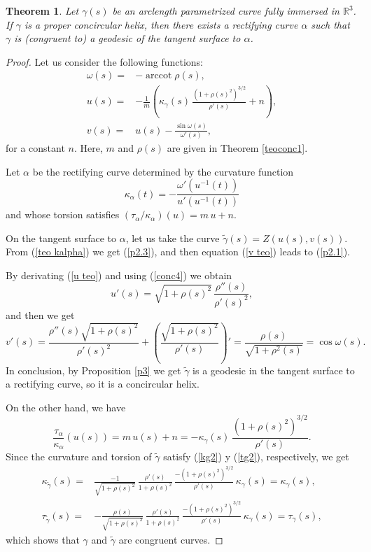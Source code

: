 \documentclass[10pt,a4paper]{amsart}
\newtheorem{theorem}{Theorem}
\def\R#1{\ensuremath{\mathbb{R}^{#1}}}
\def\Y{Z}
\DeclareMathOperator{\arccot}{arccot}
\def\tgamma{\widetilde{\gamma}}
\begin{document}
\begin{theorem}\label{th1}
Let $\gamma(s)$ be an arclength parametrized curve fully immersed in $\R3$. If $\gamma$ is a proper concircular helix, then there exists a rectifying curve $\alpha$ such that $\gamma$ is (congruent to) a geodesic of the tangent surface to $\alpha$.
\end{theorem}

\begin{proof}
Let us consider the following functions:
\begin{align}
\omega(s)= & -\arccot\rho(s), \label{w teo}\\
u(s)= & -\frac{1}{m}\left(\kappa_\gamma(s)\,\frac{(1+\rho(s)^2)^{3/2}}{\rho'(s)}+n\right), \label{u teo}\\
v(s)= & u(s)-\frac{\sin\omega(s)}{\omega'(s)}, \label{v teo}
\end{align}
for a constant $n$. Here, $m$ and $\rho(s)$ are given in Theorem \ref{teoconc1}.

Let $\alpha$ be the rectifying curve determined by the curvature function
\begin{equation}\label{teo kalpha}
  \kappa_\alpha(t)=-\frac{\omega'(u^{-1}(t))}{u'(u^{-1}(t))}
\end{equation}
and whose torsion satisfies $(\tau_\alpha/\kappa_\alpha)(u)=m\,u+n$.

On the tangent surface to $\alpha$, let us take the curve $\tgamma(s)=\Y(u(s),v(s))$. From (\ref{teo kalpha}) we get (\ref{p2.3}), and then equation (\ref{v teo}) leads to (\ref{p2.1}).

By derivating (\ref{u teo}) and using (\ref{conc4}) we obtain
\[
u'(s)=\sqrt{1+\rho(s)^2}\,\frac{\rho''(s)}{\rho'(s)^2},
\]
and then we get
\[
v'(s)=\frac{\rho''(s)\sqrt{1+\rho(s)^2}}{\rho'(s)^2}+ \left(\frac{\sqrt{1+\rho(s)^2}}{\rho'(s)}\right)'
   =\frac{\rho(s)}{\sqrt{1+\rho^2(s)}}=\cos\omega(s).
\]
In conclusion, by Proposition \ref{p3} we get $\tgamma$ is a geodesic in the tangent surface to a rectifying curve, so it is a concircular helix.

On the other hand, we have
\begin{equation*}
  \frac{\tau_\alpha}{\kappa_\alpha}(u(s))=m\,u(s)+n=-\kappa_\gamma(s)\,\frac{(1+\rho(s)^2)^{3/2}}{\rho'(s)}.
\end{equation*}
Since the curvature and torsion of $\tilde\gamma$ satisfy (\ref{kg2}) y (\ref{tg2}), respectively, we get
\begin{align*}
  \kappa_{\tgamma}(s)= &  \frac{-1}{\sqrt{1+\rho(s)^2}}\,\frac{\rho'(s)}{1+\rho(s)^2}\,\frac{-(1+\rho(s)^2)^{3/2}}{\rho'(s)}\,\kappa_\gamma(s)=\kappa_\gamma(s),\\
  \tau_{\tgamma}(s)= &  -\frac{\rho(s)}{\sqrt{1+\rho(s)^2}}\,\frac{\rho'(s)}{1+\rho(s)^2}\,\frac{-(1+\rho(s)^2)^{3/2}}{\rho'(s)}\,\kappa_\gamma(s)=\tau_\gamma(s),
\end{align*}
which shows that $\gamma$ and $\tgamma$ are congruent curves.
\end{proof}
\end{document}
